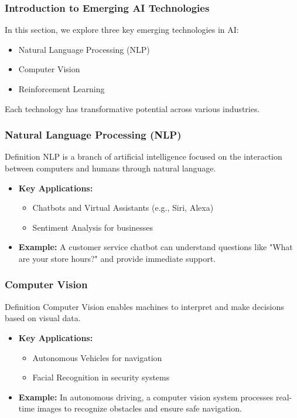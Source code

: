 \documentclass[aspectratio=169]{beamer}
\begin{document}
\begin{frame}[fragile]
    \frametitle{Introduction to Emerging AI Technologies}
    In this section, we explore three key emerging technologies in AI:
    \begin{itemize}
        \item Natural Language Processing (NLP)
        \item Computer Vision
        \item Reinforcement Learning
    \end{itemize}
    Each technology has transformative potential across various industries.
\end{frame}

\begin{frame}[fragile]
    \frametitle{Natural Language Processing (NLP)}
    \begin{block}{Definition}
        NLP is a branch of artificial intelligence focused on the interaction between computers and humans through natural language.
    \end{block}
    
    \begin{itemize}
        \item \textbf{Key Applications:}
        \begin{itemize}
            \item Chatbots and Virtual Assistants (e.g., Siri, Alexa)
            \item Sentiment Analysis for businesses
        \end{itemize}
        
        \item \textbf{Example:}
        A customer service chatbot can understand questions like "What are your store hours?" and provide immediate support.
    \end{itemize}
\end{frame}

\begin{frame}[fragile]
    \frametitle{Computer Vision}
    \begin{block}{Definition}
        Computer Vision enables machines to interpret and make decisions based on visual data.
    \end{block}
    
    \begin{itemize}
        \item \textbf{Key Applications:}
        \begin{itemize}
            \item Autonomous Vehicles for navigation
            \item Facial Recognition in security systems
        \end{itemize}
        
        \item \textbf{Example:}
        In autonomous driving, a computer vision system processes real-time images to recognize obstacles and ensure safe navigation.
    \end{itemize}
\end{frame}
\end{document}
